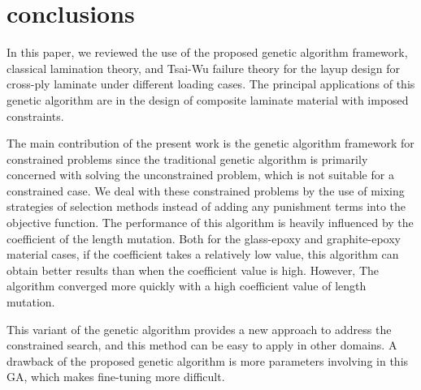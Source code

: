 \section{conclusions}
In this paper, we reviewed the use of the proposed genetic algorithm framework, classical lamination theory, and Tsai-Wu failure theory for the layup design for cross-ply laminate under different loading cases. The principal applications of this genetic algorithm are in the design of composite laminate material with imposed constraints.

The main contribution of the present work is the genetic algorithm framework for constrained problems since the traditional genetic algorithm is primarily concerned with solving the unconstrained problem, which is not suitable for a constrained case. We deal with these constrained problems by the use of mixing strategies of selection methods instead of adding any punishment terms into the objective
function. The performance of this algorithm is heavily influenced by
the coefficient of the length mutation. Both for the glass-epoxy and graphite-epoxy material cases, if the coefficient takes a relatively low value, this algorithm can obtain better results than when the coefficient value is high. However, The algorithm converged more quickly with a high coefficient value of length mutation. 

This variant of the genetic algorithm provides a new approach to address the constrained search, and this method can be easy to apply in other domains. A drawback of the proposed genetic algorithm is more parameters involving in this GA, which makes fine-tuning more difficult.
